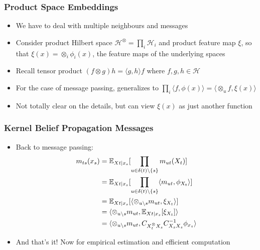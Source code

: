 \documentclass{beamer}
\begin{document}
\begin{frame}
\frametitle{Product Space Embeddings}
\begin{itemize}
\item We have to deal with multiple neighbours and messages
\vspace{1em}
\item Consider product Hilbert space $\mathscr{H}^\otimes = \prod_i \mathscr{H}_i$
    and product feature map $\xi$, so that $\xi(x) = \otimes_i \phi_i(x)$,
    the feature maps of the underlying spaces
\vspace{1em}
\item Recall tensor product $(f \otimes g)h = \langle g, h \rangle f$ where $f,g,h\in\mathscr{H}$
\vspace{1em}
\item For the case of message passing,
    generalizes to $\prod_i \langle f, \phi(x) \rangle = \langle \otimes_u f, \xi(x) \rangle$ 
\vspace{1em}
\item Not totally clear on the details, but can view $\xi(x)$ as just another function
\end{itemize}
\end{frame}

\begin{frame}
\frametitle{Kernel Belief Propagation Messages}
\begin{itemize}
\item Back to message passing:
\begin{align*}
m_{ts}(x_s)
&= \mathbb{E}_{Xt \mid x_s}[\prod_{u\in\delta(t)\setminus\left\{s\right\}}m_{ut}(X_t)]\\
&= \mathbb{E}_{Xt \mid x_s}[\prod_{u\in\delta(t)\setminus\left\{s\right\}} \langle m_{ut}, \phi_{X_t}\rangle]\\
&= \mathbb{E}_{Xt \mid x_s}[\langle \otimes_{u\setminus s} m_{ut}, \xi_{X_t}\rangle]\\
&= \langle \otimes_{u\setminus s} m_{ut}, \mathbb{E}_{Xt \mid x_s}[\xi_{X_t}]\rangle\\
&= \langle \otimes_{u\setminus s} m_{ut}, C_{X_t^\otimes X_s}C_{X_sX_s}^{-1}\phi_{x_s}\rangle
\end{align*}
\item And that's it! Now for empirical estimation and efficient computation
\end{itemize}
\end{frame}
\end{document}
